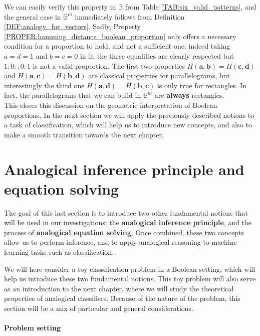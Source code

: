 We can easily verify this property in $\mathbb{B}$ from Table
\ref{TAB:six_valid_patterns}, and the general case in $\mathbb{B}^m$ immediately
follows from Definition \ref{DEF:analogy_for_vectors}. Sadly, Property
\ref{PROPER:hamming_distance_boolean_proportion} only offers a necessary
condition for a proportion to hold, and not a sufficient one: indeed taking $a
= d = 1$ and $b = c =0$ in $\mathbb{B}$, the three equalities are clearly
respected but $1:0::0:1$ is not a valid proportion. The first two
properties $H(\mathbf{a}, \mathbf{b}) = H(\mathbf{c}, \mathbf{d})$ and
$H(\mathbf{a}, \mathbf{c}) = H(\mathbf{b}, \mathbf{d})$ are classical
properties for parallelograms, but interestingly the third one $H(\mathbf{a},
\mathbf{d}) = H(\mathbf{b}, \mathbf{c})$ is only true for rectangles. In fact,
the parallelograms that we can build in $\mathbb{B}^m$ are \textbf{always}
rectangles.\\


This closes this discussion on the geometric interpretation of Boolean
proportions. In the next section we will apply the previously described notions
to a task of classification, which will help us to introduce new concepts, and
also to make a smooth transition towards the next chapter.

\section{Analogical inference principle and equation solving}
\label{SEC:machine_learning_with_boolean_proportions}

The goal of this last section is to introduce two other fundamental notions
that will be used in our investigations: the \textbf{analogical inference
principle}, and the process of \textbf{analogical equation solving}. Once
combined, these two concepts allow us to perform inference, and to apply
analogical reasoning to machine learning tasks such as classification.

We will here consider a toy classification problem in a Boolean setting, which
will help us introduce these two fundamental notions. This toy problem will
also serve as an introduction to the next chapter, where we will study the
theoretical properties of analogical classifiers. Because of the nature of the
problem, this section will be a mix of particular and general considerations.

\paragraph{Problem setting\\}

